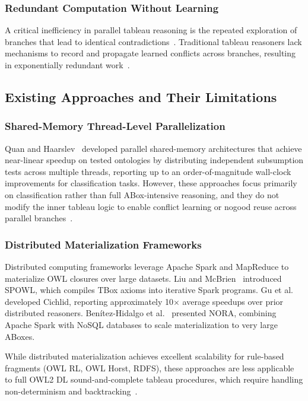 \subsubsection{Redundant Computation Without Learning}

A critical inefficiency in parallel tableau reasoning is the repeated exploration of branches that lead to identical contradictions~\cite{steigmiller2020parallelised}. Traditional tableau reasoners lack mechanisms to record and propagate learned conflicts across branches, resulting in exponentially redundant work~\cite{motik2009hypertableau}.

\subsection{Existing Approaches and Their Limitations}

\subsubsection{Shared-Memory Thread-Level Parallelization}

Quan and Haarslev~\cite{quan2017parallel,quan2019framework} developed parallel shared-memory architectures that achieve near-linear speedup on tested ontologies by distributing independent subsumption tests across multiple threads, reporting up to an order-of-magnitude wall-clock improvements for classification tasks. However, these approaches focus primarily on classification rather than full ABox-intensive reasoning, and they do not modify the inner tableau logic to enable conflict learning or nogood reuse across parallel branches~\cite{quan2019framework}.

\subsubsection{Distributed Materialization Frameworks}

Distributed computing frameworks leverage Apache Spark and MapReduce to materialize OWL closures over large datasets. Liu and McBrien~\cite{liu2017spowl} introduced SPOWL, which compiles TBox axioms into iterative Spark programs. Gu et al.~\cite{gu2015cichlid} developed Cichlid, reporting approximately 10$\times$ average speedups over prior distributed reasoners. Benítez-Hidalgo et al.~\cite{benitez2023nora} presented NORA, combining Apache Spark with NoSQL databases to scale materialization to very large ABoxes.

While distributed materialization achieves excellent scalability for rule-based fragments (OWL RL, OWL Horst, RDFS), these approaches are less applicable to full OWL2 DL sound-and-complete tableau procedures, which require handling non-determinism and backtracking~\cite{wu2016parallel}.

